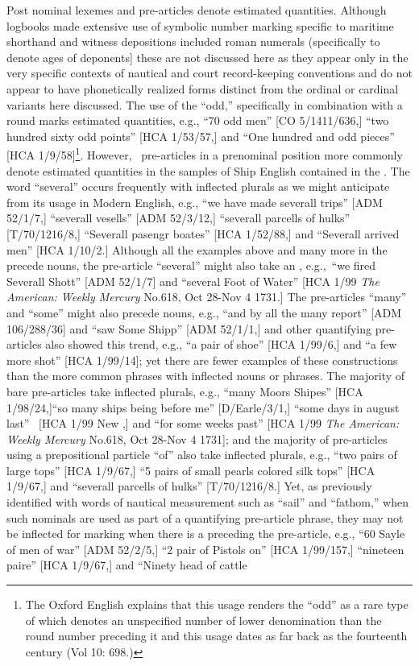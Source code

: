 Post nominal lexemes and  pre-articles denote estimated quantities. Although logbooks made extensive use of symbolic number marking specific to maritime shorthand and witness depositions included roman numerals (specifically to denote ages of deponents] these are not discussed here as they appear only in the very specific contexts of nautical and court record-keeping conventions and do not appear to have phonetically realized forms distinct from the ordinal or cardinal variants here discussed.  The use of the  “odd,” specifically in combination with a round  marks estimated quantities, e.g., “70 odd men” [CO 5/1411/636,] “two hundred sixty odd points” [HCA 1/53/57,] and “One hundred and odd pieces” [HCA 1/9/58]\footnote{The Oxford English \citet{Dictionary1989} explains that this usage renders the  “odd” as a rare type of   which denotes an unspecified number of lower denomination than the round number preceding it and this usage dates as far back as the fourteenth century (Vol 10: 698.)}.  However,~ pre-articles in a prenominal position more commonly denote estimated quantities in the samples of Ship English contained in the . The word “several” occurs frequently with inflected plurals as we might anticipate from its usage in Modern English, e.g., “we have made severall trips” [ADM 52/1/7,] “severall vesells” [ADM 52/3/12,] “severall parcells of hulks” [T/70/1216/8,] “Severall pasengr boates” [HCA 1/52/88,] and “Severall arrived men” [HCA 1/10/2.] Although all the examples above and many more in the  precede  nouns, the pre-article “several” might also take an  , e.g.,~“we fired Severall Shott” [ADM 52/1/7] and “several Foot of Water” [HCA 1/99 \textit{The American: Weekly Mercury} No.618, Oct 28-Nov 4 1731.] The pre-articles “many” and “some” might also precede  nouns, e.g., “and by all the many report” [ADM 106/288/36] and “saw Some Shipp” [ADM 52/1/1,] and other quantifying pre-articles also showed this trend, e.g., “a pair of shoe” [HCA 1/99/6,] and “a few more shot” [HCA 1/99/14]; yet there are fewer examples of these constructions than the more common phrases with inflected nouns or  phrases. The majority of bare pre-articles take inflected plurals, e.g., “many Moors Shipes” [HCA 1/98/24,]“so many ships being before me” [D/Earle/3/1,] “some days in august last” ~[HCA 1/99 New \citealt{Providence1722},] and “for some weeks past” [HCA 1/99 \textit{The American: Weekly Mercury} No.618, Oct 28-Nov 4 1731]; and the majority of pre-articles using a prepositional particle “of” also take inflected plurals, e.g., “two pairs of large tops” [HCA 1/9/67,] “5 pairs of small pearls colored silk tops” [HCA 1/9/67,] and “severall parcells of hulks” [T/70/1216/8.] Yet, as previously identified with words of nautical measurement such as “sail” and “fathom,” when such nominals are used as part of a quantifying pre-article phrase, they may not be inflected for  marking when there is a  preceding the pre-article, e.g., “60 Sayle of men of war” [ADM 52/2/5,] “2 pair of Pistols on” [HCA 1/99/157,] “nineteen paire” [HCA 1/9/67,] and “Ninety head of cattle 